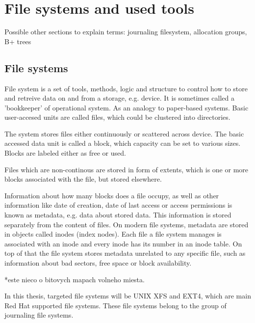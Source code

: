 \documentclass[
  color, %
  table, %
  lof,   %
  lot,   %
]{fithesis3}
\begin{document}
\chapter{File systems and used tools}
Possible other sections to explain terms: journaling filesystem, allocation groups, B+ trees
\section{File systems}
File system is a set of tools, methods, logic and structure to control how to store and retreive data on and from a storage, e.g. device. It is sometimes called a 'bookkeeper' of operational system. As an  analogy to paper-based systems. Basic user-accesed units are called files, which could be clustered into directories.

The system stores files either continuously or scattered across device. The basic accessed data unit is called a block, which capacity can be set to various sizes. Blocks are labeled either as free or used.

Files which are non-continous are stored in form of extents, which is one or more blocks associated with the file, but stored elsewhere.  

Information about how many blocks does a file occupy, as well as other information like date of creation, date of last access or access permissions is known as metadata, e.g. data about stored data. This information is stored separately from the content of files. On modern file systems, metadata are stored in objects called inodes (index nodes). Each file a file system manages is associated with an inode and every inode has its number in an inode table. On top of that the file system stores metadata unrelated to any specific file, such as information about bad sectors, free space or block availability.


*este nieco o bitovych mapach volneho miesta.

In this thesis, targeted file systems will be UNIX XFS and EXT4, which are main Red Hat supported file systems. These file systems belong to the group of journaling file systems.
\end{document}
